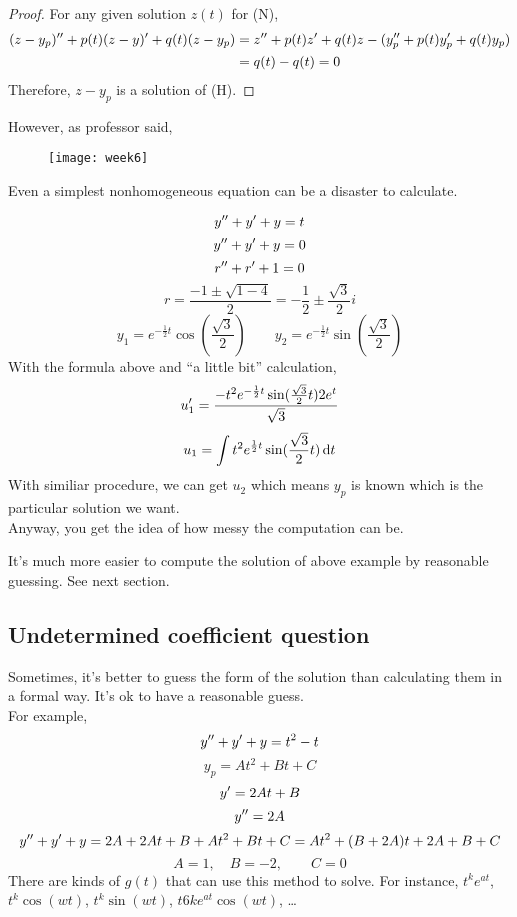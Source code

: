 \begin{proof}
For any given solution $z(t)$ for (N),\\
\[\begin{aligned}
(z-y_p)^{\prime\prime}+p(t)(z-y)^{\prime}+q(t)(z-y_p)&=z^{\prime\prime}+p(t)z^{\prime}+q(t)z-(y_p^{\prime\prime}+p(t)y_p^{\prime}+q(t)y_p)\\
&=q(t)-q(t)=0
\end{aligned}
\]
Therefore, $z-y_p$ is a solution of (H).
\end{proof}
However, as professor said,
\begin{figure}[H]
\centering
\texttt{[image: week6]}
\end{figure}
Even a simplest nonhomogeneous equation can be a disaster to calculate.
\begin{example}
\[y^{\prime\prime}+y^{\prime}+y=t
\]
\[y^{\prime\prime}+y^{\prime}+y=0
\]
\[r^{\prime\prime}+r^{\prime}+1=0
\]
\[r=\frac{-1\pm\sqrt{1-4}}{2}=-\frac{1}{2}\pm\frac{\sqrt3}{2}i
\]
\[y_1=e^{-\frac{1}{2}t}\cos (\frac{\sqrt3}{2})\qquad y_2=e^{-\frac{1}{2}t}\sin (\frac{\sqrt3}{2})
\]
With the formula above and ``a little bit'' calculation,
\[u_1^{\prime}=\frac{-t^2e^{-\frac{1}{2}t}\sin(\frac{\sqrt{3}}{2}t)2e^{t}}{\sqrt3}
\]
\[u_1=\int t^2e^{\frac{1}{2}t}\sin(\frac{\sqrt3}{2}t)\,\mathrm{d} t
\]
With similiar procedure, we can get $u_2$ which means $y_p$ is known which is the particular solution we want.\\
Anyway, you get the idea of how messy the computation can be.
\end{example}
\begin{remark}
It's much more easier to compute the solution of above example by reasonable guessing. See next section.


\end{remark}
\subsection{Undetermined coefficient question}
Sometimes, it's better to guess the form of the solution than calculating them in a formal way.
It's ok to have a reasonable guess.\\For example,
\[y^{\prime\prime}+y^{\prime}+y=t^2-t
\]
\[y_p=At^2+Bt+C
\]
\[y^{\prime}=2At+B
\]
\[y^{\prime\prime}=2A
\]
\[y^{\prime\prime}+y^{\prime}+y=2A+2At+B+At^2+Bt+C=At^2+(B+2A)t+2A+B+C
\]
\[A=1,\quad B=-2,\qquad C=0
\]
There are kinds of $g(t)$ that can use this method to solve. For instance, $t^ke^{at}$, $t^k\cos(wt)$, $t^k\sin(wt)$, $t6ke^{at}\cos(wt)$, \dots
